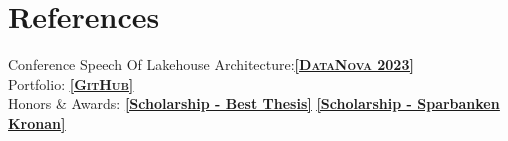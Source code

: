 \documentclass[10pt,a4paper,sans,colorlinks,linkcolor=blue,urlcolor=blue]{moderncv}
\begin{document}
\section{References}
Conference Speech Of Lakehouse Architecture:\underline{\href{https://www.starburst.io/datanova/on-demand/?wvideo=n53ubhz7hb}{\textbf{\textsc{[DataNova 2023]}}}}\\
Portfolio: \underline{\href{https://github.com/Thelin90}{\textbf{\textsc{[GitHub]}}}}\\
Honors \& Awards: \href{https://www.hms-networks.com/work/in/sweden/hms-scholarship}{\textbf{\underline{[Scholarship - Best Thesis]}}} \href{http://www.hh.se/omhogskolan/aktuellt/nyheter/nyheter/studenterbelonasavsparbanksstiftelsenkronan.65446700.html}{\textbf{\underline{[Scholarship - Sparbanken Kronan]}}}

\vfill
\enlargethispage{\footskip}
\end{document}
